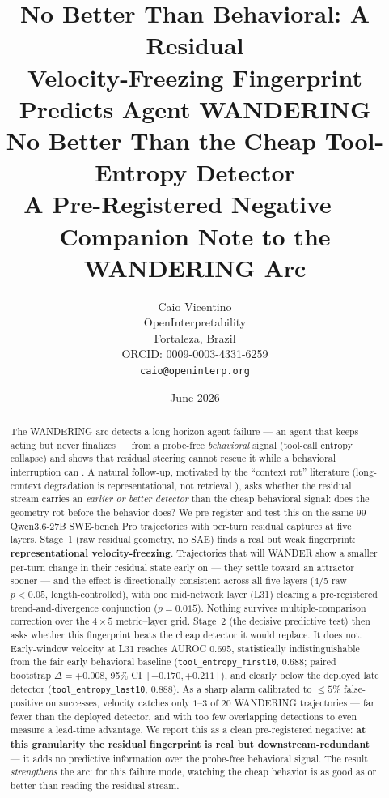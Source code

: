 \documentclass[11pt]{article}
\title{No Better Than Behavioral: A Residual \\
Velocity-Freezing Fingerprint Predicts Agent WANDERING \\
No Better Than the Cheap Tool-Entropy Detector \\[2pt]
\large A Pre-Registered Negative --- Companion Note to the WANDERING Arc}
\author{%
  Caio Vicentino \\
  OpenInterpretability \\
  Fortaleza, Brazil \\
  ORCID: 0009-0003-4331-6259 \\
  \texttt{caio@openinterp.org}%
}
\date{June 2026}
\begin{document}
\maketitle

\begin{abstract}
The WANDERING arc detects a long-horizon agent failure --- an agent that keeps acting but never finalizes --- from a probe-free \emph{behavioral} signal (tool-call entropy collapse) and shows that residual steering cannot rescue it while a behavioral interruption can \cite{tool_entropy,residual_nulls,multichannel,modality}. A natural follow-up, motivated by the ``context rot'' literature (long-context degradation is representational, not retrieval \cite{contextrot}), asks whether the residual stream carries an \emph{earlier or better detector} than the cheap behavioral signal: does the geometry rot before the behavior does? We pre-register and test this on the same 99 Qwen3.6-27B SWE-bench Pro trajectories with per-turn residual captures at five layers. Stage~1 (raw residual geometry, no SAE) finds a real but weak fingerprint: \textbf{representational velocity-freezing}. Trajectories that will WANDER show a smaller per-turn change in their residual state early on --- they settle toward an attractor sooner --- and the effect is directionally consistent across all five layers (4/5 raw $p<0.05$, length-controlled), with one mid-network layer (L31) clearing a pre-registered trend-and-divergence conjunction ($p=0.015$). Nothing survives multiple-comparison correction over the $4\times5$ metric--layer grid. Stage~2 (the decisive predictive test) then asks whether this fingerprint beats the cheap detector it would replace. It does not. Early-window velocity at L31 reaches AUROC $0.695$, statistically indistinguishable from the fair early behavioral baseline (\texttt{tool\_entropy\_first10}, $0.688$; paired bootstrap $\Delta=+0.008$, 95\% CI $[-0.170,+0.211]$), and clearly below the deployed late detector (\texttt{tool\_entropy\_last10}, $0.888$). As a sharp alarm calibrated to $\le 5\%$ false-positive on successes, velocity catches only $1$--$3$ of $20$ WANDERING trajectories --- far fewer than the deployed detector, and with too few overlapping detections to even measure a lead-time advantage. We report this as a clean pre-registered negative: \textbf{at this granularity the residual fingerprint is real but downstream-redundant} --- it adds no predictive information over the probe-free behavioral signal. The result \emph{strengthens} the arc: for this failure mode, watching the cheap behavior is as good as or better than reading the residual stream.
\end{abstract}
\end{document}
